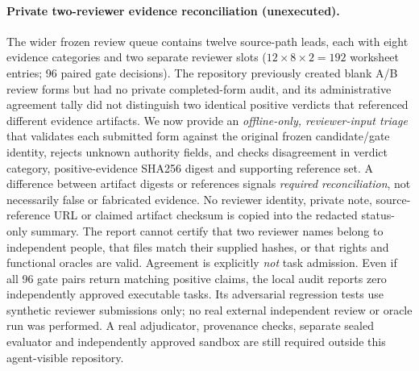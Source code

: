 \documentclass[pdflatex,sn-basic]{sn-jnl}
\begin{document}
\paragraph{Private two-reviewer evidence reconciliation (unexecuted).}
The wider frozen review queue contains twelve source-path
leads, each with eight evidence categories and two separate
reviewer slots ($12\times8\times2=192$ worksheet entries;
96 paired gate decisions). The repository previously created
blank A/B review forms but had no private completed-form audit,
and its administrative agreement tally did not distinguish
two identical positive verdicts that referenced different
evidence artifacts. We now provide an \emph{offline-only,
reviewer-input triage} that validates each submitted form
against the original frozen candidate/gate identity, rejects
unknown authority fields, and checks disagreement in verdict
category, positive-evidence SHA256 digest and supporting
reference set. A difference between artifact digests or
references signals \emph{required reconciliation}, not
necessarily false or fabricated evidence. No reviewer
identity, private note, source-reference URL or claimed
artifact checksum is copied into the redacted status-only
summary. The report cannot certify that two reviewer names
belong to independent people, that files match their supplied
hashes, or that rights and functional oracles are valid.
Agreement is explicitly \emph{not} task admission. Even
if all 96 gate pairs return matching positive claims,
the local audit reports zero independently approved
executable tasks. Its adversarial regression tests use
synthetic reviewer submissions only; no real external
independent review or oracle run was performed. A real
adjudicator, provenance checks, separate sealed evaluator
and independently approved sandbox are still required
outside this agent-visible repository.
\end{document}
